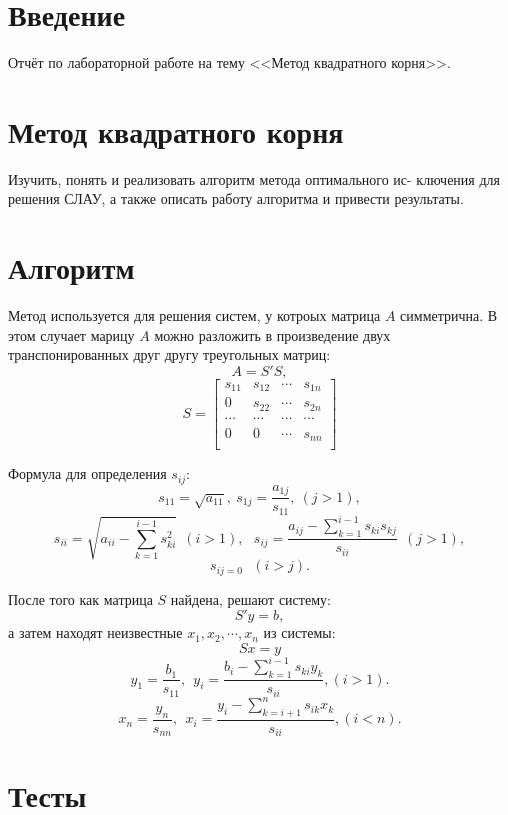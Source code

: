 \documentclass[14pt, titlepage,fleqn]{extarticle}
\begin{document}
	

	
	
	\newpage
	
	\tableofcontents   
	\clearpage
	\section*{Введение}
	Отчёт по лабораторной работе на тему <<Метод квадратного корня>>.	
	\newpage









	\section*{Метод квадратного корня}
	Изучить, понять и реализовать алгоритм метода оптимального ис-
	ключения для решения СЛАУ, а также описать работу алгоритма и
	привести результаты.

	\section*{Алгоритм}
	Метод используется для решения систем, у котроых матрица $A$ симметрична. В этом случает марицу $A$ можно разложить в произведение двух транспонированных друг другу треугольных матриц:
	\[A = S'S,\]
	\[S = \begin{bmatrix}
		s_{11} & s_{12} & \cdots & s_{1n} \\
		0 & s_{22} & \cdots & s_{2n} \\
		\cdots & \cdots & \cdots & \cdots \\
		0 & 0 & \cdots & s_{nn} \\
	\end{bmatrix}\]

	Формула для определения $s_{ij}:$
	\[s_{11} = \sqrt{a_{11}}, ~ s_{1j} = \dfrac{a_{1j}}{s_{11}},~ (j>1),\]
	\[s_{ii} = \sqrt{a_{ii} - \sum_{k = 1}^{i - 1}s^2_{ki}}~~(i>1),~~~ s_{ij} = \dfrac{a_{ij} - \sum_{k = 1}^{i - 1}s_{ki}s_{kj}}{s_{ii}} ~~ (j>1),\]
	\[s_{ij = 0} ~~~ (i>j).\]

	После того как матрица $S$ найдена, решают систему:
	\[S'y =b ,\]
	\newpage
	а затем находят неизвестные $x_1,x_2,\cdots,x_n$ из системы:
	\[Sx = y\]
	\[y_1 = \dfrac{b_1}{s_{11}}, ~~ y_i = \dfrac{b_i - \sum_{k = 1}^{i - 1}s_{ki}y_k}{s_{ii}}, (i > 1).\]
	\[x_n = \dfrac{y_n}{s_{nn}},~~ x_i = \dfrac{y_i - \sum_{k = i+1}^{n}s_{ik}x_k}{s_{ii}}, (i<n).\]
	
	\section*{Тесты}
\end{document}
